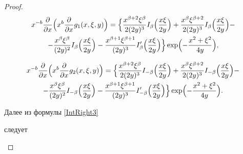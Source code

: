 \begin{proof}
\begin{multline}
x^{-b} \frac{\partial}{\partial x}\Bigl(x^{b}\frac{\partial  }{\partial x} g_1(x,\xi,y)

\Bigr)=

\Bigl\{

\frac{x^{\beta+2}\xi^{\beta}}{2(2y)^3}

I_{\beta}\Bigl(\frac{x\xi}{2y}\Bigr)+

\frac{ x^{\beta}\xi^{\beta+2}}{2 (2y)^3}

I_{\beta}\Bigl(\frac{x\xi}{2y}\Bigr)-

\\

-\frac{x^{\beta}\xi^{\beta}}{(2y)^2}

I_{\beta}\Bigl(\frac{x\xi}{2y}\Bigr)-

\frac{x^{\beta+1}\xi^{\beta+1}}{(2y)^3}

I'_{\beta}\Bigl(\frac{x\xi}{2y}\Bigr)\Bigr\}\exp\Bigl({-\frac{ x^2+\xi^2}{4y}}\Bigr),

\end{multline}

\begin{multline}

x^{-b}\frac{\partial}{\partial x}

\Bigl(x^{b}\frac{\partial  }{\partial x} g_2(x,\xi,y)

\Bigr)=

\Bigl\{

\frac{ x^{\beta+2}\xi^{\beta}}{2 (2y)^3}

I_{-\beta}\Bigl(\frac{x\xi}{2y}\Bigr)+

\frac{ x^{\beta}\xi^{\beta+2}}{2 (2y)^3}

I_{-\beta}\Bigl(\frac{x\xi}{2y}\Bigr)-

\\

-\frac{x^{\beta}\xi^{\beta}}{(2y)^2}

I_{-\beta}\Bigl(\frac{x\xi}{2y}\Bigr)-

\frac{x^{\beta+1}\xi^{\beta+1}}{(2y)^3}

I'_{-\beta}\Bigl(\frac{x\xi}{2y}\Bigr)\Bigr\}\exp\Bigl({-\frac{ x^2+\xi^2}{4y}}\Bigr).

\end{multline}





Далее из формулы \eqref{IntRight3}

следует

\begin{equation} \label{GammaDifD0y}


\end{equation}
\end{proof}
